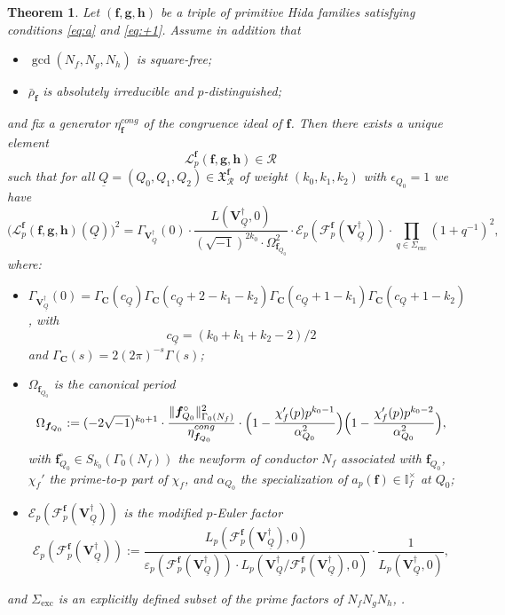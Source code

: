 \documentclass[10pt,letterpaper]{amsart}
\theoremstyle{plain}
\newtheorem{thm}{Theorem}[subsection] %
\theoremstyle{definition}
\theoremstyle{definition}
\theoremstyle{plain}
\theoremstyle{plain}
\theoremstyle{plain}
\theoremstyle{remark}
\numberwithin{equation}{section}
\newcommand{\bC}{\mathbf{C}}
\newcommand{\VQdag}{{\mathbf{V}_{\underline{Q}}^\dagger}}
\newcommand{\cR}{\mathbb{I}}
\newcommand{\bff}{{\boldsymbol{f}}}
\newcommand{\bfg}{{\boldsymbol{g}}}
\newcommand{\bfh}{{\boldsymbol{h}}}
\begin{document}
\begin{thm}\label{thm:hsieh-triple}
Let $(\bff,\bfg,\bfh)$ be a triple of primitive Hida families 
satisfying conditions \eqref{eq:a} and \eqref{eq:+1}. Assume in addition that
\begin{itemize}
\item $\gcd(N_f,N_g,N_h)$ is square-free;
\item $\bar{\rho}_{\bff}$ is absolutely irreducible and $p$-distinguished;
\end{itemize}
and fix a generator $\eta_{\bff}^{cong}$ of the congruence ideal of $\bff$. Then there exists a unique element 
\[
\mathscr{L}_p^{\bff}(\bff,\bfg,\bfh)\in\mathcal{R}
\]
such that for all $\underline{Q}=(Q_0,Q_1,Q_2)\in\mathfrak{X}_{\mathcal{R}}^{\bff}$ of weight $(k_0,k_1,k_2)$ with $\epsilon_{Q_0}=1$ we have
\[
\bigl(\mathscr{L}_p^{\bff}(\bff,\bfg,\bfh)(\underline{Q})\bigr)^2=\Gamma_{\VQdag}(0)\cdot\frac{L(\VQdag,0)}{(\sqrt{-1})^{2k_{0}}\cdot\Omega_{\bff_{Q_0}}^2}\cdot\mathcal{E}_p(\mathscr{F}_p^{\bff}(\VQdag))\cdot\prod_{q\in\Sigma_{\mathrm{exc}}}(1+q^{-1})^2,
\]
where:
\begin{itemize}
\item $\Gamma_{\VQdag}(0)=\Gamma_{\bC}(c_{\underline{Q}})\Gamma_\bC(c_{\underline{Q}}+2-k_1-k_2)\Gamma_\bC(c_{\underline{Q}}+1-k_1)\Gamma_\bC(c_{\underline{Q}}+1-k_2)$, with 
\[
c_{\underline{Q}}=(k_0+k_1+k_2-2)/2
\] 
and $\Gamma_\bC(s)=2(2\pi)^{-s}\Gamma(s)$;
\item $\Omega_{\bff_{Q_0}}$ is the canonical period
\[
\Omega_{\bff_{Q_0}}:=(-2\sqrt{-1})^{k_0+1}\cdot\frac{\Vert\bff_{Q_0}^\circ\Vert_{\Gamma_0(N_f)}^2}{\eta_{\bff_{Q_0}}^{cong}}\cdot\Bigl(1-\frac{\chi_{f}'(p)p^{k_0-1}}{\alpha_{Q_0}^2}\Bigr)\Bigl(1-\frac{\chi_{f}'(p)p^{k_0-2}}{\alpha_{Q_0}^2}\Bigr),
\]
with $\bff_{Q_0}^\circ\in S_{k_0}(\Gamma_0(N_{f}))$ the newform of conductor $N_f$ associated with $\bff_{Q_0}$, $\chi_f'$ the prime-to-$p$ part of $\chi_f$, and $\alpha_{Q_0}$ the specialization of $a_p(\bff)\in\cR_f^\times$ at $Q_0$;
\item $\mathcal{E}_p(\mathscr{F}_p^{\bff}(\VQdag))$ is the modified $p$-Euler factor
\[
\mathcal{E}_p(\mathscr{F}_p^{\bff}(\VQdag)):=\frac{L_p(\mathscr{F}_p^{\bff}(\VQdag),0)}{\varepsilon_p(\mathscr{F}_p^{\bff}(\VQdag))\cdot L_p(\VQdag/\mathscr{F}_p^{\bff}(\VQdag),0)}\cdot\frac{1}{L_p(\VQdag,0)},
\]
\end{itemize}
and $\Sigma_{\mathrm{exc}}$ is an explicitly defined subset of the prime factors of $N_f N_g N_h$, \cite[p.~416]{hsieh-triple}.
\end{thm}
\end{document}
